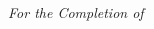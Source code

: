 \begin{titlepage}
\begin{addmargin}[-1cm]{-3cm}
\begin{flushleft}
        \vfill

        \emph{For the Completion of}\\
        \myDegree \\ \bigskip

        \myDepartment \\
        \myUni \\ \bigskip

        \vfill

    \end{flushleft}
  \end{addmargin}
\end{titlepage}
